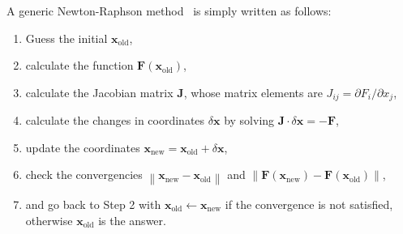 \documentclass[aps,showkeys,noshowpacs,superscriptaddress,pre,preprint]{revtex4-2}
\begin{document}
A generic Newton-Raphson method~\cite{NR} is simply written as follows:
\begin{enumerate}
\item Guess the initial $\mathbf{x}_\mathrm{old}$,
\item calculate the function ${\mathbf{F} \left( \mathbf{x}_\mathrm{old} \right)}$,
\item calculate the Jacobian matrix $\mathbf{J}$,
whose matrix elements are $J_{ij} = \partial F_i / \partial x_j$,
\item calculate the changes in coordinates $\delta \mathbf{x}$ 
by solving $\mathbf{J} \cdot {\delta \mathbf{x}} = - \mathbf{F}$,
\item update the coordinates $\mathbf{x}_\mathrm{new} = \mathbf{x}_\mathrm{old} + {\delta \mathbf{x}}$,
\item check the convergencies $\left\| \mathbf{x}_\mathrm{new} - \mathbf{x}_\mathrm{old} \right\|$
and $\left\| {\mathbf{F} \left( \mathbf{x}_\mathrm{new} \right)} - {\mathbf{F} \left( \mathbf{x}_\mathrm{old} \right)} \right\|$,
\item and go back to Step 2 with $\mathbf{x}_\mathrm{old} \leftarrow \mathbf{x}_\mathrm{new}$ if the convergence is not satisfied,
otherwise $\mathbf{x}_\mathrm{old}$ is the answer.
\end{enumerate}
\end{document}

